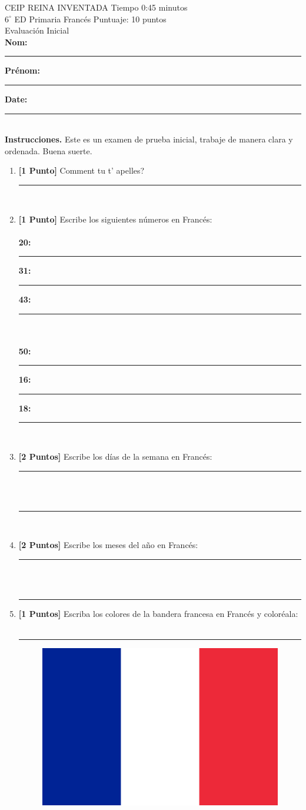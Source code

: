 \documentclass{article}
\begin{document}
{\sc CEIP REINA INVENTADA} \hfill Tiempo 0:45 minutos\\
{\sc $6^{\circ}$ ED Primaria Franc\'es} \hfill Puntuaje: 10 puntos\\
{\sc Evaluaci\'on Inicial}\\

{\bf Nom:}  \rule{40mm}{0.1mm} 
{\bf Pr\'enom:} \rule{60mm}{0.1mm}
{\bf Date:} \rule{30mm}{0.1mm}\\

{\bf Instrucciones.} Este es un examen de prueba inicial, trabaje de manera clara y ordenada. Buena suerte.\\

\begin{enumerate}
\item{\bf [1 Punto]} Comment tu t' apelles? \rule{107mm}{0.1mm}\\
\item{\bf [1 Punto]} Escribe los siguientes n\'umeros en Franc\'es:\\\\
	{\bf 20:}  \rule{47mm}{0.1mm} 
	{\bf 31:} \rule{47mm}{0.1mm}
	{\bf 43:} \rule{46mm}{0.1mm}\\\\
	{\bf 50:}  \rule{47mm}{0.1mm} 
	{\bf 16:} \rule{47mm}{0.1mm}
	{\bf 18:} \rule{46mm}{0.1mm}\\
\item{\bf [2 Puntos]} Escribe los d\'ias de la semana en Franc\'es: \rule{77mm}{0.1mm}\\\\
\rule{161mm}{0.1mm}\\
\item{\bf [2 Puntos]} Escribe los meses del a\~{n}o en Franc\'es: \rule{83mm}{0.1mm}\\\\
\rule{161mm}{0.1mm}
\item{\bf [1 Puntos]} Escriba los colores de la bandera francesa en Franc\'es y color\'eala:\\\\
\rule{161mm}{0.01mm}
\begin{figure}[h]
\begin{center}
\includegraphics[scale=0.05]{images.png}

\end{center}
\end{figure}
\end{enumerate}
\end{document}
